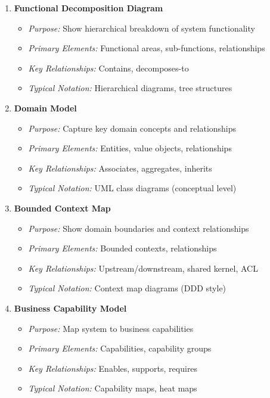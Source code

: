 \documentclass[11pt,letterpaper]{article}
\begin{document}
\begin{enumerate}[label=\textbf{MT\arabic*:}, leftmargin=2.5em]
    \item \textbf{Functional Decomposition Diagram}
    \begin{itemize}[nosep]
        \item \textit{Purpose:} Show hierarchical breakdown of system functionality
        \item \textit{Primary Elements:} Functional areas, sub-functions, relationships
        \item \textit{Key Relationships:} Contains, decomposes-to
        \item \textit{Typical Notation:} Hierarchical diagrams, tree structures
    \end{itemize}
    
    \item \textbf{Domain Model}
    \begin{itemize}[nosep]
        \item \textit{Purpose:} Capture key domain concepts and relationships
        \item \textit{Primary Elements:} Entities, value objects, relationships
        \item \textit{Key Relationships:} Associates, aggregates, inherits
        \item \textit{Typical Notation:} UML class diagrams (conceptual level)
    \end{itemize}
    
    \item \textbf{Bounded Context Map}
    \begin{itemize}[nosep]
        \item \textit{Purpose:} Show domain boundaries and context relationships
        \item \textit{Primary Elements:} Bounded contexts, relationships
        \item \textit{Key Relationships:} Upstream/downstream, shared kernel, ACL
        \item \textit{Typical Notation:} Context map diagrams (DDD style)
    \end{itemize}
    
    \item \textbf{Business Capability Model}
    \begin{itemize}[nosep]
        \item \textit{Purpose:} Map system to business capabilities
        \item \textit{Primary Elements:} Capabilities, capability groups
        \item \textit{Key Relationships:} Enables, supports, requires
        \item \textit{Typical Notation:} Capability maps, heat maps
    \end{itemize}
    

\end{enumerate}
\end{document}
